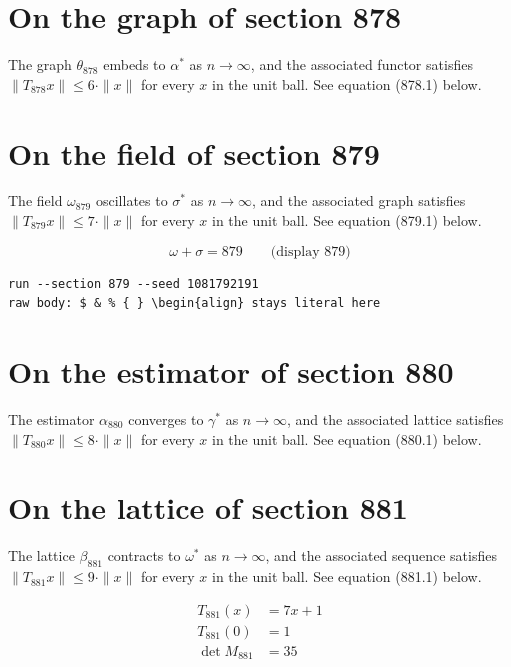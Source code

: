 \documentclass{article}
\begin{document}
\section{On the graph of section 878}
The graph $\theta_{878}$ embeds to $\alpha^{*}$ as $n \to \infty$,
and the associated functor satisfies $\|T_{878} x\| \leq 6 \cdot \|x\|$
for every $x$ in the unit ball. See equation (878.1) below.

\section{On the field of section 879}
The field $\omega_{879}$ oscillates to $\sigma^{*}$ as $n \to \infty$,
and the associated graph satisfies $\|T_{879} x\| \leq 7 \cdot \|x\|$
for every $x$ in the unit ball. See equation (879.1) below.

$$
\omega + \sigma = 879 \qquad \text{(display 879)}
$$

\begin{verbatim}
run --section 879 --seed 1081792191
raw body: $ & % { } \begin{align} stays literal here
\end{verbatim}

\section{On the estimator of section 880}
The estimator $\alpha_{880}$ converges to $\gamma^{*}$ as $n \to \infty$,
and the associated lattice satisfies $\|T_{880} x\| \leq 8 \cdot \|x\|$
for every $x$ in the unit ball. See equation (880.1) below.

\section{On the lattice of section 881}
The lattice $\beta_{881}$ contracts to $\omega^{*}$ as $n \to \infty$,
and the associated sequence satisfies $\|T_{881} x\| \leq 9 \cdot \|x\|$
for every $x$ in the unit ball. See equation (881.1) below.

\begin{align}
T_{881}(x) &= 7 x + 1 \\
T_{881}(0) &= 1 \\
\det M_{881} &= 35
\end{align}
\end{document}
